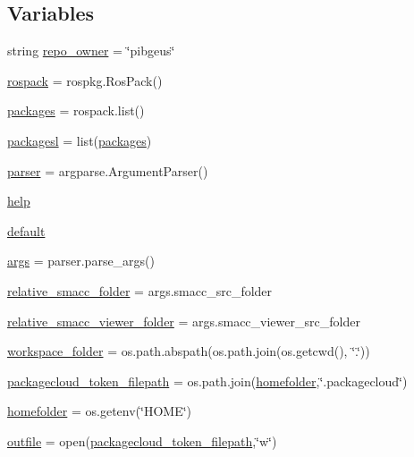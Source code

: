 \subsection*{Variables}
\begin{DoxyCompactItemize}
\item 
string \hyperlink{namespacegenerate__debs_adec04970ffa308e6dec7d8e42f63fc55}{repo\+\_\+owner} = \char`\"{}pibgeus\char`\"{}
\item 
\hyperlink{namespacegenerate__debs_a609fa33c1ebbff173ec90524eeb7b49d}{rospack} = rospkg.\+Ros\+Pack()
\item 
\hyperlink{namespacegenerate__debs_a40d4732827c5678f3f48354238245e1d}{packages} = rospack.\+list()
\item 
\hyperlink{namespacegenerate__debs_acac340506bc1d8ca0d0881b9c00bfea2}{packagesl} = list(\hyperlink{namespacegenerate__debs_a40d4732827c5678f3f48354238245e1d}{packages})
\item 
\hyperlink{namespacegenerate__debs_a4a9ae4bb85fc62d7973ea3d09ced6c26}{parser} = argparse.\+Argument\+Parser()
\item 
\hyperlink{namespacegenerate__debs_ab09f4294da5036d5f6881672de9ed9c7}{help}
\item 
\hyperlink{namespacegenerate__debs_a3d67a92b7eb3a59c397dc9fdd1c67558}{default}
\item 
\hyperlink{namespacegenerate__debs_a75f9143e38df82d83b2e8a6f99cae02c}{args} = parser.\+parse\+\_\+args()
\item 
\hyperlink{namespacegenerate__debs_abf6925bd06ac1da3981fe638eefb5a61}{relative\+\_\+smacc\+\_\+folder} = args.\+smacc\+\_\+src\+\_\+folder
\item 
\hyperlink{namespacegenerate__debs_a22d892b78adfce583710d78737eb4747}{relative\+\_\+smacc\+\_\+viewer\+\_\+folder} = args.\+smacc\+\_\+viewer\+\_\+src\+\_\+folder
\item 
\hyperlink{namespacegenerate__debs_acb69863b90257249a30e43ebacfb8bd8}{workspace\+\_\+folder} = os.\+path.\+abspath(os.\+path.\+join(os.\+getcwd(), \char`\"{}.\char`\"{}))
\item 
\hyperlink{namespacegenerate__debs_a836a20b989c3c8e46255d91d10cb524f}{packagecloud\+\_\+token\+\_\+filepath} = os.\+path.\+join(\hyperlink{namespacegenerate__debs_aeb83979be2939a8059435a906a91f682}{homefolder},\char`\"{}.packagecloud\char`\"{})
\item 
\hyperlink{namespacegenerate__debs_aeb83979be2939a8059435a906a91f682}{homefolder} = os.\+getenv(\char`\"{}H\+O\+ME\char`\"{})
\item 
\hyperlink{namespacegenerate__debs_aa1faa039b35b72ee44dc6f106ad12911}{outfile} = open(\hyperlink{namespacegenerate__debs_a836a20b989c3c8e46255d91d10cb524f}{packagecloud\+\_\+token\+\_\+filepath},\char`\"{}w\char`\"{})
\end{DoxyCompactItemize}


